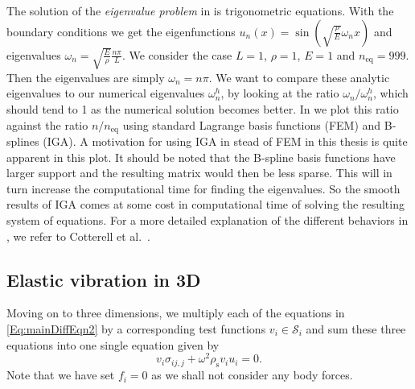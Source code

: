 The solution of the \textit{eigenvalue problem} in  is trigonometric equations. With the boundary conditions we get the eigenfunctions $u_n(x) = \sin \left(\sqrt{\frac{\rho}{E}}\omega_n x\right)$ and eigenvalues $\omega_n = \sqrt{\frac{E}{\rho}}\frac{n\pi}{L}$. We consider the case $L=1$, $\rho=1$, $E=1$ and $n_{\mathrm{eq}} = 999$. Then the eigenvalues are simply $\omega_n = n\pi$. We want to compare these analytic eigenvalues to our numerical eigenvalues $\omega_n^h$, by looking at the ratio $\omega_n/\omega_n^h$, which should tend to 1 as the numerical solution becomes better. In  we plot this ratio against the ratio $n/n_{\mathrm{eq}}$ using standard Lagrange basis functions (FEM) and B-splines (IGA). A motivation for using IGA in stead of FEM in this thesis is quite apparent in this plot. It should be noted that the B-spline basis functions have larger support and the resulting matrix would then be less sparse. This will in turn increase the computational time for finding the eigenvalues. So the smooth results of IGA comes at some cost in computational time of solving the resulting system of equations. For a more detailed explanation of the different behaviors in , we refer to Cotterell et al.~\cite{Cottrell2009iat}. 


\subsection{Elastic vibration in 3D}
Moving on to three dimensions, we multiply each of the equations in \eqref{Eq:mainDiffEqn2} by a corresponding test functions $v_i\in\mathcal{S}_i$ and sum these three equations into one single equation given by
\begin{equation*}
	v_i\sigma_{ij,j} +\omega^2\rho_{\mathrm{s}} v_i u_i = 0.
\end{equation*}
Note that we have set $f_i=0$ as we shall not consider any body forces. 

